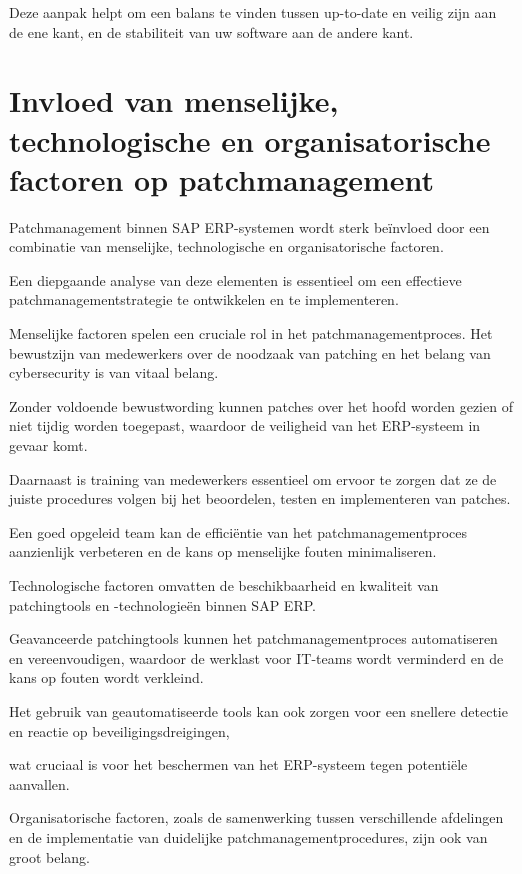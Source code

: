 Deze aanpak helpt om een balans te vinden tussen up-to-date en veilig zijn aan de ene kant, en de stabiliteit van uw software aan de andere kant.








\section{Invloed van menselijke, technologische en organisatorische factoren op patchmanagement}

Patchmanagement binnen SAP ERP-systemen wordt sterk beïnvloed door een combinatie van menselijke, technologische en organisatorische factoren. 

Een diepgaande analyse van deze elementen is essentieel om een effectieve patchmanagementstrategie te ontwikkelen en te implementeren.

Menselijke factoren spelen een cruciale rol in het patchmanagementproces. Het bewustzijn van medewerkers over de noodzaak van patching en het belang van cybersecurity is van vitaal belang.

Zonder voldoende bewustwording kunnen patches over het hoofd worden gezien of niet tijdig worden toegepast, waardoor de veiligheid van het ERP-systeem in gevaar komt. 

Daarnaast is training van medewerkers essentieel om ervoor te zorgen dat ze de juiste procedures volgen bij het beoordelen, testen en implementeren van patches.

Een goed opgeleid team kan de efficiëntie van het patchmanagementproces aanzienlijk verbeteren en de kans op menselijke fouten minimaliseren.

Technologische factoren omvatten de beschikbaarheid en kwaliteit van patchingtools en -technologieën binnen SAP ERP.

Geavanceerde patchingtools kunnen het patchmanagementproces automatiseren en vereenvoudigen, waardoor de werklast voor IT-teams wordt verminderd en de kans op fouten wordt verkleind. 

Het gebruik van geautomatiseerde tools kan ook zorgen voor een snellere detectie en reactie op beveiligingsdreigingen,

wat cruciaal is voor het beschermen van het ERP-systeem tegen potentiële aanvallen.

Organisatorische factoren, zoals de samenwerking tussen verschillende afdelingen en de implementatie van duidelijke patchmanagementprocedures, zijn ook van groot belang. 

